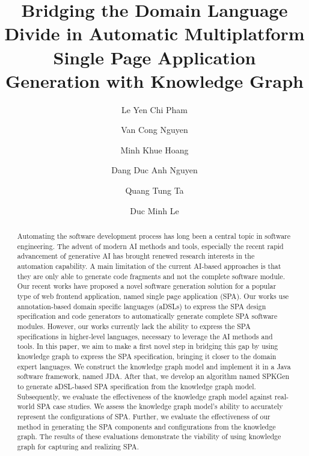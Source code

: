 \documentclass[runningheads]{llncs}
\begin{document}
\title{Bridging the Domain Language Divide in Automatic Multiplatform Single Page Application Generation with Knowledge Graph}
%
%
\author{
Le Yen Chi Pham  \and 
Van Cong Nguyen  \and
Minh Khue Hoang  \and 
Dang Duc Anh Nguyen  \and 
Quang Tung Ta \and 
Duc Minh Le 
}

%
%
\maketitle              %
%
\begin{abstract}
Automating the software development process has long been a central topic in software engineering. The advent of modern AI methods and tools, especially the recent rapid advancement of generative AI has brought renewed research interests in the automation capability. A main limitation of the current AI-based approaches is that they are only able to generate code fragments and not the complete software module. Our recent works have proposed a novel software generation solution for a popular type of web frontend application, named single page application (SPA). Our works use annotation-based domain specific languages (aDSLs) to express the SPA design specification and code generators to automatically generate complete SPA software modules. However, our works currently lack the ability to express the SPA specifications in higher-level languages, necessary to leverage the AI methods and tools. In this paper, we aim to make a first novel step in bridging this gap by using knowledge graph to express the SPA specification, bringing it closer to the domain expert languages. We construct the knowledge graph model and implement it in a Java software framework, named JDA. After that, we develop an algorithm named SPKGen to generate aDSL-based SPA specification from the knowledge graph model. Subsequently, we evaluate the effectiveness of the knowledge graph model against real-world SPA case studies. We assess the knowledge graph model's ability to accurately represent the configurations of SPA. Further, we evaluate the effectiveness of our method in generating the SPA components and configurations from the knowledge graph. The results of these evaluations demonstrate the viability of using knowledge graph for capturing and realizing SPA.


\end{abstract}
%
%
%
\end{document}
